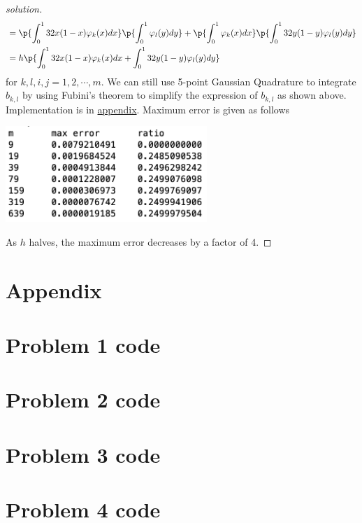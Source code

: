 \documentclass[11pt]{article}
\begin{document}
\begin{proof}[solution]
\begin{align*}
            &= \p{\int_0^1 32x(1-x)\varphi_k(x) dx} \p{\int_0^1 \varphi_l(y) dy} 
            +  \p{\int_0^1 \varphi_k(x) dx} \p{\int_0^1 32y(1-y)\varphi_l(y) dy}  \\
            &= h \p{\int_0^1 32x(1-x)\varphi_k(x) dx + \int_0^1 32y(1-y)\varphi_l(y) dy}
    \end{align*}
    for $k,l,i,j = 1,2,\cdots,m$. We can still use 5-point Gaussian Quadrature to integrate $b_{k,l}$ by using Fubini's theorem to simplify the expression of $b_{k,l}$ as shown above. Implementation is in \hyperref[q4code]{appendix}. Maximum error is given as follows
    \begin{center}
        \includegraphics[width=3in]{q4_out} 
    \end{center}
    As $h$ halves, the maximum error decreases by a factor of 4. 
\end{proof}


\newpage
\section*{Appendix}

\newpage
\section*{Problem 1 code}
\label{q1code}

\newpage
\section*{Problem 2 code}
\label{q2code}

\newpage
\section*{Problem 3 code}
\label{q3code}

\newpage
\section*{Problem 4 code}
\label{q4code}

\end{document}
